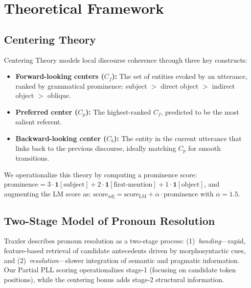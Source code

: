 \documentclass[11pt]{article}
\begin{document}
\section{Theoretical Framework}

\subsection{Centering Theory}

Centering Theory \citep{grosz1995,traxler2012} models local discourse coherence through three key constructs:
\begin{itemize}[leftmargin=*]
    \item \textbf{Forward-looking centers ($C_f$):} The set of entities evoked by an utterance, ranked by grammatical prominence: subject $>$ direct object $>$ indirect object $>$ oblique.
    \item \textbf{Preferred center ($C_p$):} The highest-ranked $C_f$, predicted to be the most salient referent.
    \item \textbf{Backward-looking center ($C_b$):} The entity in the current utterance that links back to the previous discourse, ideally matching $C_p$ for smooth transitions.
\end{itemize}

We operationalize this theory by computing a prominence score: $\text{prominence} = 3 \cdot \mathbf{1}[\text{subject}] + 2 \cdot \mathbf{1}[\text{first-mention}] + 1 \cdot \mathbf{1}[\text{object}]$, and augmenting the LM score as: $\text{score}_{\text{adj}} = \text{score}_{\text{LM}} + \alpha \cdot \text{prominence}$ with $\alpha = 1.5$.

\subsection{Two-Stage Model of Pronoun Resolution}

Traxler \citep{traxler2012} describes pronoun resolution as a two-stage process: (1)~\emph{bonding}---rapid, feature-based retrieval of candidate antecedents driven by morphosyntactic cues, and (2)~\emph{resolution}---slower integration of semantic and pragmatic information. Our Partial PLL scoring operationalizes stage-1 (focusing on candidate token positions), while the centering bonus adds stage-2 structural information.
\end{document}

